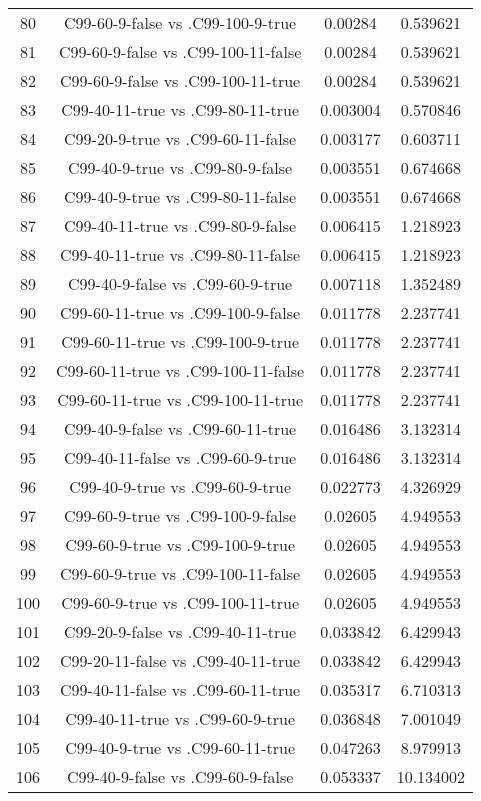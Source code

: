 \documentclass[a4paper,10pt]{article}
\begin{document}
\begin{landscape}
\begin{table}[!htp]
\begin{tabular}{cccc}
80&C99-60-9-false vs .C99-100-9-true&0.00284&0.539621\\
81&C99-60-9-false vs .C99-100-11-false&0.00284&0.539621\\
82&C99-60-9-false vs .C99-100-11-true&0.00284&0.539621\\
83&C99-40-11-true vs .C99-80-11-true&0.003004&0.570846\\
84&C99-20-9-true vs .C99-60-11-false&0.003177&0.603711\\
85&C99-40-9-true vs .C99-80-9-false&0.003551&0.674668\\
86&C99-40-9-true vs .C99-80-11-false&0.003551&0.674668\\
87&C99-40-11-true vs .C99-80-9-false&0.006415&1.218923\\
88&C99-40-11-true vs .C99-80-11-false&0.006415&1.218923\\
89&C99-40-9-false vs .C99-60-9-true&0.007118&1.352489\\
90&C99-60-11-true vs .C99-100-9-false&0.011778&2.237741\\
91&C99-60-11-true vs .C99-100-9-true&0.011778&2.237741\\
92&C99-60-11-true vs .C99-100-11-false&0.011778&2.237741\\
93&C99-60-11-true vs .C99-100-11-true&0.011778&2.237741\\
94&C99-40-9-false vs .C99-60-11-true&0.016486&3.132314\\
95&C99-40-11-false vs .C99-60-9-true&0.016486&3.132314\\
96&C99-40-9-true vs .C99-60-9-true&0.022773&4.326929\\
97&C99-60-9-true vs .C99-100-9-false&0.02605&4.949553\\
98&C99-60-9-true vs .C99-100-9-true&0.02605&4.949553\\
99&C99-60-9-true vs .C99-100-11-false&0.02605&4.949553\\
100&C99-60-9-true vs .C99-100-11-true&0.02605&4.949553\\
101&C99-20-9-false vs .C99-40-11-true&0.033842&6.429943\\
102&C99-20-11-false vs .C99-40-11-true&0.033842&6.429943\\
103&C99-40-11-false vs .C99-60-11-true&0.035317&6.710313\\
104&C99-40-11-true vs .C99-60-9-true&0.036848&7.001049\\
105&C99-40-9-true vs .C99-60-11-true&0.047263&8.979913\\
106&C99-40-9-false vs .C99-60-9-false&0.053337&10.134002\\

\end{tabular}
\end{table}
\end{landscape}
\end{document}
